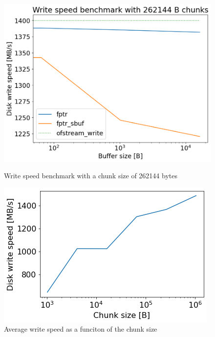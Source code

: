   \begin{figure}[H]
    \centering
    \begin{minipage}{.45\textwidth}
      \centering
      \includegraphics[width=\linewidth]{media/write_bench_262144.png}
      \caption{Write speed benchmark with a chunk size of 262144 bytes}
      \label{fig:write_bench_262144}
    \end{minipage}%
    \hfill
    \begin{minipage}{.45\textwidth}
      \centering
      \includegraphics[width=\linewidth]{media/chunk_bench.png}
      \caption{Average write speed as a funciton of the chunk size}
      \label{fig:chunk_bench}
    \end{minipage}
  \end{figure}


